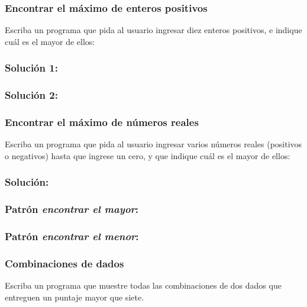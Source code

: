 \documentclass[12pt]{beamer}
\begin{document}
  \begin{frame}
    \frametitle{Encontrar el máximo de enteros positivos}
    \label{problema-maximo-positivos}
    Escriba un programa que pida al usuario
    ingresar diez enteros positivos,
    e indique cuál es el mayor de ellos:
    
  \end{frame}

  \begin{frame}
    \frametitle{Solución 1:}
    \label{solucion-1-maximo-positivos}
    
  \end{frame}

  \begin{frame}
    \frametitle{Solución 2:}
    \label{solucion-2-maximo-positivos}
    
  \end{frame}

  \begin{frame}
    \frametitle{Encontrar el máximo de números reales}
    \label{problema-maximo-reales}
    Escriba un programa que pida al usuario
    ingresar varios números reales (positivos o negativos)
    hasta que ingrese un cero,
    y que indique cuál es el mayor de ellos:
    
  \end{frame}

  \begin{frame}
    \frametitle{Solución:}
    \label{solucion-maximo-reales}
    
  \end{frame}

  \begin{frame}
    \frametitle{Patrón \emph{encontrar el mayor}:}
    \label{patron-mayor}
    
  \end{frame}

  \begin{frame}
    \frametitle{Patrón \emph{encontrar el menor}:}
    \label{patron-menor}
    
  \end{frame}

  \begin{frame}
    \frametitle{Combinaciones de dados}
    \label{problema-combinaciones-dados}
    Escriba un programa que muestre
    todas las combinaciones de dos dados
    que entreguen un puntaje mayor que siete.
  \end{frame}
\end{document}
